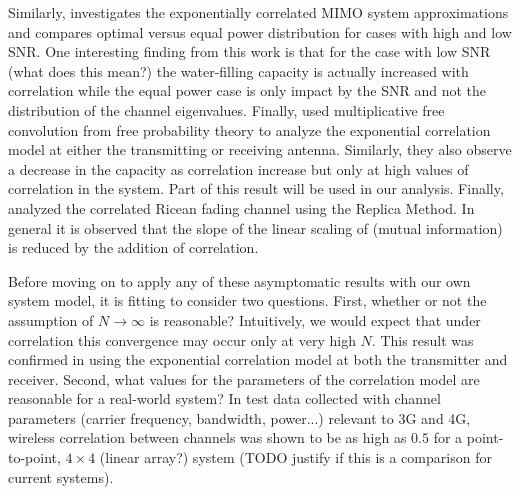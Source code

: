 Similarly, \cite{chuah2002capacity} investigates the exponentially correlated MIMO system approximations and compares optimal versus equal power distribution for cases with high and low SNR. One interesting finding from this work is that for the case with low
SNR (what does this mean?) the water-filling capacity is actually increased with correlation while the equal power case is only impact by the SNR and not the distribution of the channel eigenvalues. 
Finally, \cite{skupch2005free} used multiplicative free convolution from free probability theory to analyze the exponential correlation model at either the transmitting or receiving antenna. Similarly, they also observe a decrease in the capacity as correlation increase but only at high values of correlation in the system. Part of this result will be used in our analysis. 
Finally,
\cite{taricco2008asymptotic} analyzed the correlated Ricean fading channel using the Replica Method. 
In general it is observed that the slope of the linear scaling of (mutual information) is reduced by the addition of correlation. 
\par
Before moving on to apply any of these asymptomatic results with our own system model, it is fitting to consider two questions. 
First, whether or not the assumption of  $N \rightarrow \infty$ is reasonable? Intuitively, we would expect that under correlation this convergence may occur only at very high $N$. This result was confirmed in  \cite{martin2004asymptotic} using the exponential correlation model at both the transmitter and receiver. 
Second, what values for the parameters of the correlation model are reasonable for a real-world system?
In test data collected with channel parameters (carrier frequency, bandwidth, power...) relevant to 3G and 4G, wireless correlation between channels was shown to be as high as $0.5$ for a point-to-point, $4 \times 4$ (linear array?) system \cite{martin2000multiple} (TODO justify if this is a comparison for current systems).
